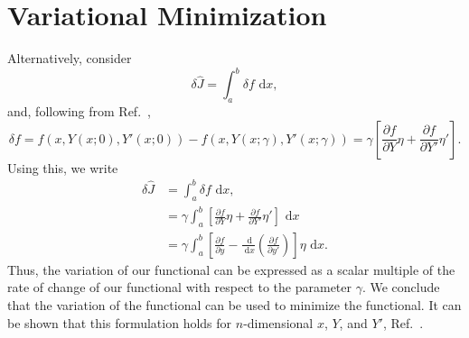 \section{Variational Minimization}
Alternatively, consider
\begin{equation}
\delta\hat J = \int_a^b{\delta f}\text{ d}x,
\end{equation}
and, following from Ref.~\cite{cornelius1970variational},
\begin{equation}
\delta f = f(x,Y(x;0),Y'(x;0))-f(x,Y(x;\gamma),Y'(x;\gamma)) = \gamma\left[\frac{\partial f}{\partial Y}\eta+\frac{\partial f}{\partial Y'}\eta'\right].
\end{equation}
Using this, we write
\begin{align}
\delta\hat J &= \int_a^b{\delta f}\text{ d}x,\\
             &= \gamma\int_a^b{\left[\frac{\partial f}{\partial Y}\eta+\frac{\partial f}{\partial Y'}\eta'\right]}\text{ d}x\\
             &= \gamma\int_a^b{\left[\frac{\partial f}{\partial y}-\frac{\text{ d}}{\text{ d}x}\left(\frac{\partial f}{\partial y'}\right)\right]}\eta\text{ d}x.
\end{align}
Thus, the variation of our functional can be expressed as a scalar multiple of the rate of change of our functional with respect to the parameter $\gamma$. We conclude that the variation of the functional can be used to minimize the functional. It can be shown  that this formulation holds for $n$-dimensional $x$, $Y$, and $Y'$,  Ref.~\cite{cornelius1970variational}.

